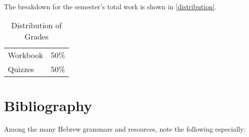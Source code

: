 \documentclass[titlepage]{article}
\newcommand\policy{../policy}
\begin{document}
The breakdown for the semester's total work is shown in
\autoref{distribution}.

\begin{table}[htbp]
  \centering
  {\lining
  \begin{tabular}{lr}
    \toprule
    Workbook & 50\% \\
    Quizzes  & 50\% \\
    \bottomrule
  \end{tabular}}
  \caption{Distribution of Grades}
  \label{distribution}
\end{table}





\section{Bibliography}
\label{bib}

Among the many Hebrew grammars and resources, note the following
especially:
\end{document}
